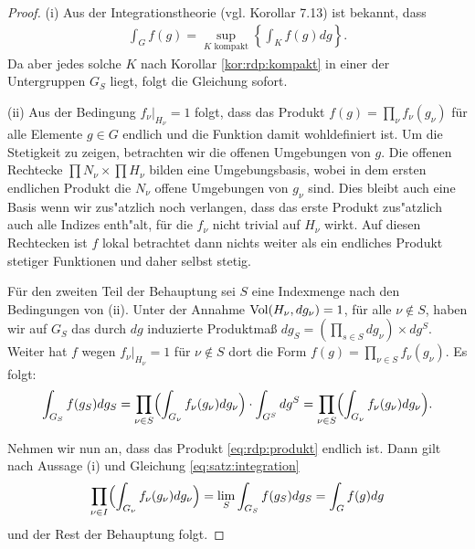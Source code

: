 		\begin{proof}
			(i) Aus der Integrationstheorie (vgl. \textcite{folland} Korollar 7.13) ist bekannt, dass 
			\begin{align*}
				\int_{G} f(g) = \sup_{K \text{ kompakt}} \left\{ \int_{K} f(g)dg \right\}.
			\end{align*}
			Da aber jedes solche $K$ nach Korollar \ref{kor:rdp:kompakt} in einer der Untergruppen $G_S$ liegt, folgt die Gleichung sofort.
			
			(ii) Aus der Bedingung $f_\nu |_{H_\nu} = 1$ folgt, dass das Produkt $f(g) = \prod_{\nu}f_{\nu}(g_\nu)$ für alle Elemente $g \in G$ endlich und die Funktion damit wohldefiniert ist. 
			Um die Stetigkeit zu zeigen, betrachten wir die offenen Umgebungen von $g$.
			Die offenen Rechtecke $\prod N_\nu \times \prod H_\nu$ bilden eine Umgebungsbasis, wobei in dem ersten endlichen Produkt die $N_\nu$ offene Umgebungen von $g_\nu$ sind. 
			Dies bleibt auch eine Basis wenn wir zus"atzlich noch verlangen, dass das erste Produkt zus"atzlich auch alle Indizes enth"alt, für die $f_\nu$ nicht trivial auf $H_\nu$ wirkt.
			Auf diesen Rechtecken ist $f$ lokal betrachtet dann nichts weiter als ein endliches Produkt stetiger Funktionen und daher selbst stetig.
			
			Für den zweiten Teil der Behauptung sei $S$ eine Indexmenge nach den Bedingungen von (ii). 
			Unter der Annahme $\operatorname{Vol}(H_\nu, dg_\nu) = 1$, für alle $\nu \notin S$, haben wir auf $G_S$ das durch $dg$ induzierte Produktmaß $dg_S =\left(\prod_{s \in S}dg_\nu\right) \times dg^S$.
			Weiter hat $f$ wegen $f_\nu|_{H_\nu} = 1$ für $\nu \notin S$ dort die Form $f(g) = \prod_{\nu\in S}f_\nu(g_\nu)$. 
			Es folgt:
			\begin{align*}
				\int_{G_S} f(g_S) dg_S = \prod_{\nu\in S}\Bigl(\int_{G_\nu} f_\nu (g_\nu)dg_\nu\Bigr) \cdot \int_{G^S} dg^S = \prod_{\nu\in S}\Bigl(\int_{G_\nu} f_\nu (g_\nu)dg_\nu\Bigr).
			\end{align*}
			
			Nehmen wir nun an, dass das Produkt \eqref{eq:rdp:produkt} endlich ist. 
			Dann gilt nach Aussage (i) und Gleichung \eqref{eq:satz:integration}
			\begin{align*}
				\prod_{\nu\in I}\Bigl(\int_{G_\nu} f_\nu (g_\nu)dg_\nu\Bigr) = \lim_S \int_{G_S} f(g_S) dg_S = \int_{G} f(g) dg
			\end{align*}
			und der Rest der Behauptung folgt.
		\end{proof}
